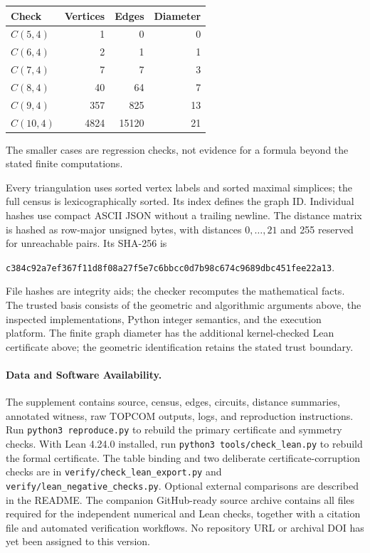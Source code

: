 \documentclass[11pt]{article}
\begin{document}
\begin{center}
\begin{tabular}{lrrr}
\toprule
Check & Vertices & Edges & Diameter\\
\midrule
$C(5,4)$ & 1 & 0 & 0\\
$C(6,4)$ & 2 & 1 & 1\\
$C(7,4)$ & 7 & 7 & 3\\
$C(8,4)$ & 40 & 64 & 7\\
$C(9,4)$ & 357 & 825 & 13\\
$C(10,4)$ & 4824 & 15120 & 21\\
\bottomrule
\end{tabular}
\end{center}
The smaller cases are regression checks, not evidence for a formula beyond
the stated finite computations.

Every triangulation uses sorted vertex labels and sorted maximal simplices;
the full census is lexicographically sorted. Its index defines the graph ID.
Individual hashes use compact ASCII JSON without a trailing newline.
The distance matrix is hashed as row-major unsigned bytes, with distances
$0,\ldots,21$ and 255 reserved for unreachable pairs. Its SHA-256 is
\begin{center}\small\texttt{c384c92a7ef367f11d8f08a27f5e7c6bbcc0d7b98c674c9689dbc451fee22a13}.\end{center}
File hashes are integrity aids; the checker recomputes the mathematical facts.
The trusted basis consists of the geometric and algorithmic arguments above,
the inspected implementations, Python integer semantics, and the execution
platform. The finite graph diameter has the additional kernel-checked Lean
certificate above; the geometric identification retains the stated trust boundary.

\paragraph{Data and Software Availability.}
The supplement contains source, census, edges, circuits, distance summaries,
annotated witness, raw TOPCOM outputs, logs, and reproduction instructions.
Run \texttt{python3 reproduce.py} to rebuild the primary certificate and
symmetry checks. With Lean 4.24.0 installed, run
\texttt{python3 tools/check\_lean.py} to rebuild the formal certificate.
The table binding and two deliberate certificate-corruption checks are in
\texttt{verify/check\_lean\_export.py} and
\texttt{verify/lean\_negative\_checks.py}.
Optional external comparisons are described in the README.
The companion GitHub-ready source archive contains all files required for
the independent numerical and Lean checks, together with a citation file and
automated verification workflows. No repository URL or archival DOI has yet
been assigned to this version.
\end{document}
